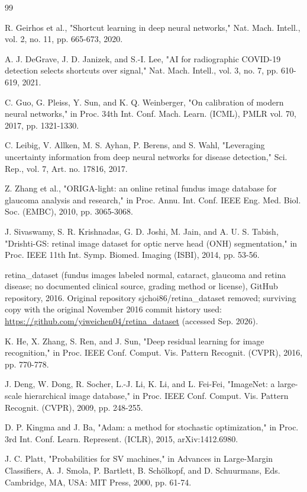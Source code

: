 \documentclass[conference,a4paper]{IEEEtran}
\begin{document}
\begin{thebibliography}{99}

R. Geirhos et al., "Shortcut learning in deep neural networks," Nat. Mach. Intell., vol. 2, no. 11,
pp. 665-673, 2020.


A. J. DeGrave, J. D. Janizek, and S.-I. Lee, "AI for radiographic COVID-19 detection selects
shortcuts over signal," Nat. Mach. Intell., vol. 3, no. 7, pp. 610-619, 2021.


C. Guo, G. Pleiss, Y. Sun, and K. Q. Weinberger, "On calibration of modern neural networks," in
Proc. 34th Int. Conf. Mach. Learn. (ICML), PMLR vol. 70, 2017, pp. 1321-1330.


C. Leibig, V. Allken, M. S. Ayhan, P. Berens, and S. Wahl, "Leveraging uncertainty information from
deep neural networks for disease detection," Sci. Rep., vol. 7, Art. no. 17816, 2017.


Z. Zhang et al., "ORIGA-light: an online retinal fundus image database for glaucoma analysis and
research," in Proc. Annu. Int. Conf. IEEE Eng. Med. Biol. Soc. (EMBC), 2010, pp. 3065-3068.


J. Sivaswamy, S. R. Krishnadas, G. D. Joshi, M. Jain, and A. U. S. Tabish, "Drishti-GS: retinal
image dataset for optic nerve head (ONH) segmentation," in Proc. IEEE 11th Int. Symp. Biomed.
Imaging (ISBI), 2014, pp. 53-56.


retina\_dataset (fundus images labeled normal, cataract, glaucoma and retina disease; no documented
clinical source, grading method or license), GitHub repository, 2016. Original repository
sjchoi86/retina\_dataset removed; surviving copy with the original November 2016 commit history
used: \url{https://github.com/yiweichen04/retina_dataset} (accessed Sep. 2026).


K. He, X. Zhang, S. Ren, and J. Sun, "Deep residual learning for image recognition," in Proc. IEEE
Conf. Comput. Vis. Pattern Recognit. (CVPR), 2016, pp. 770-778.


J. Deng, W. Dong, R. Socher, L.-J. Li, K. Li, and L. Fei-Fei, "ImageNet: a large-scale hierarchical
image database," in Proc. IEEE Conf. Comput. Vis. Pattern Recognit. (CVPR), 2009, pp. 248-255.


D. P. Kingma and J. Ba, "Adam: a method for stochastic optimization," in Proc. 3rd Int. Conf. Learn.
Represent. (ICLR), 2015, arXiv:1412.6980.


J. C. Platt, "Probabilities for SV machines," in Advances in Large-Margin Classifiers, A. J. Smola,
P. Bartlett, B. Schölkopf, and D. Schuurmans, Eds. Cambridge, MA, USA: MIT Press, 2000, pp. 61-74.

\end{thebibliography}



\end{document}
